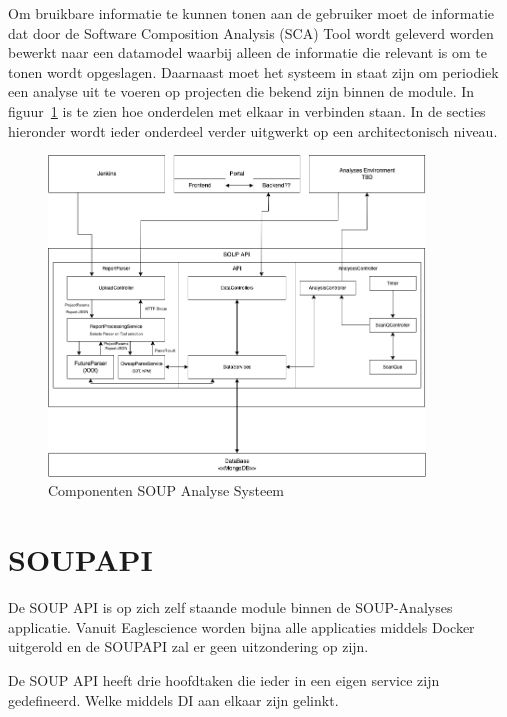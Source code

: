 Om bruikbare informatie te kunnen tonen aan de gebruiker moet de informatie dat door de Software Composition Analysis (SCA) Tool wordt geleverd worden bewerkt naar een datamodel waarbij alleen de informatie die relevant is om te tonen wordt opgeslagen. Daarnaast moet het systeem in staat zijn om periodiek een analyse uit te voeren op projecten die bekend zijn binnen de module. In figuur~\ref{fig:SOUP-Components} is te zien hoe onderdelen met elkaar in verbinden staan.
In de secties hieronder wordt ieder onderdeel verder uitgwerkt op een architectonisch niveau.


\begin{figure}[bth]
    \myfloatalign
    \includegraphics[width=10cm]{gfx/SOUPAPI-SOUPAPI MODULES}
    \caption{Componenten SOUP Analyse Systeem}
    \label{fig:SOUP-Components}
\end{figure}





\section{SOUPAPI}\label{sec:soupapi}
De SOUP API is op zich zelf staande module binnen de SOUP-Analyses applicatie. Vanuit Eaglescience worden bijna alle applicaties middels Docker uitgerold en de SOUPAPI zal er geen uitzondering op zijn.

De SOUP API heeft drie hoofdtaken die ieder in een eigen service zijn gedefineerd. Welke middels DI aan elkaar zijn gelinkt.

